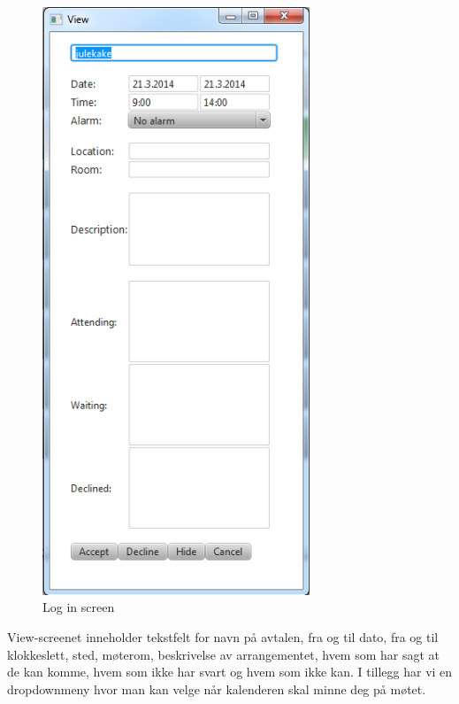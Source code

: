 \documentclass{article}
\begin{document}
\begin{figure}[h!] 
    \begin{center} 
        \includegraphics[width=8cm]{ViewScreen.png}
        \caption{Log in screen}
    \label{login}
    \end{center}
\end{figure}
View-screenet inneholder tekstfelt for navn på avtalen, fra og til dato, fra og til klokkeslett, sted, møterom, beskrivelse av arrangementet, hvem som har sagt at de kan komme, hvem som ikke har svart og hvem som ikke kan. I tillegg har vi en dropdownmeny hvor man kan velge når kalenderen skal minne deg på møtet.
\end{document}
